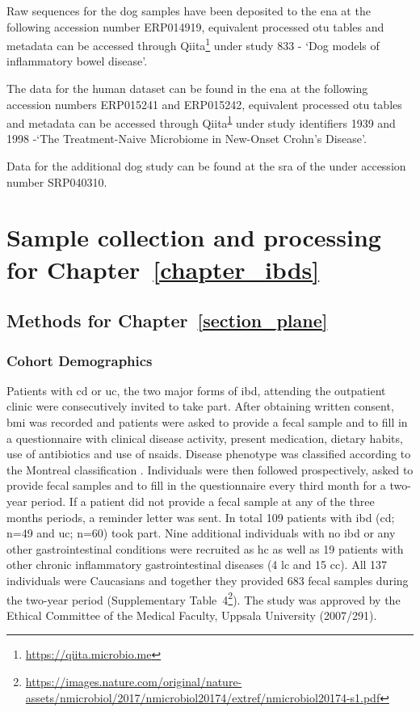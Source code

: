 Raw sequences for the dog samples have been deposited to the \gls{ena} at the 
following accession number ERP014919, equivalent processed \gls{otu} tables and 
metadata can be accessed through 
Qiita\footnote{\label{qiitaurl}\url{https://qiita.microbio.me}} under study 833 
- `Dog models of inflammatory bowel disease'.

The data for the human dataset\cite{RN154} can be found in the \gls{ena} at the 
following accession numbers ERP015241 and ERP015242, equivalent processed 
\gls{otu} tables and metadata can be accessed through 
Qiita\textsuperscript{\ref{qiitaurl}} under study identifiers 1939 and 1998 
-`The Treatment-Naive Microbiome in New-Onset Crohn's Disease'.

Data for the additional dog study \cite{RN153} can be found at the \gls{sra} of 
the under accession number SRP040310.

\chapter{Sample collection and processing for 
Chapter~\ref{chapter_ibds}}\label{appendix_ibds}

\section{Methods for Chapter~\ref{section_plane}}\label{appendix_plane}

\subsection{Cohort Demographics}

Patients with \gls{cd} or \gls{uc}, the two major forms of \gls{ibd}, attending 
the outpatient clinic were consecutively invited to take part. After obtaining 
written consent, \gls{bmi} was recorded and patients were asked to provide a 
fecal sample and to fill in a questionnaire with clinical disease activity, 
present medication, dietary habits, use of antibiotics and use of 
\glspl{nsaid}. Disease phenotype was classified according to the Montreal 
classification \cite{Silverberg2005}. Individuals were then followed 
prospectively, asked to provide fecal samples and to fill in the questionnaire 
every third month for a two-year period. If a patient did not provide a fecal 
sample at any of the three months periods, a reminder letter was sent. In total 
109 patients with \gls{ibd} (\gls{cd}; n=49 and \gls{uc}; n=60) took part. Nine 
additional individuals with no \gls{ibd} or any other gastrointestinal 
conditions were recruited as \gls{hc} as well as 19 patients with other chronic 
inflammatory gastrointestinal diseases (4 \gls{lc} and 15 \gls{cc}).  All 137 
individuals were Caucasians and together they provided 683 fecal samples during 
the two-year period (Supplementary 
Table~4\footnote{\url{https://images.nature.com/original/nature-assets/nmicrobiol/2017/nmicrobiol20174/extref/nmicrobiol20174-s1.pdf}}).  
The study was approved by the Ethical Committee of the Medical Faculty, Uppsala 
University (2007/291).

